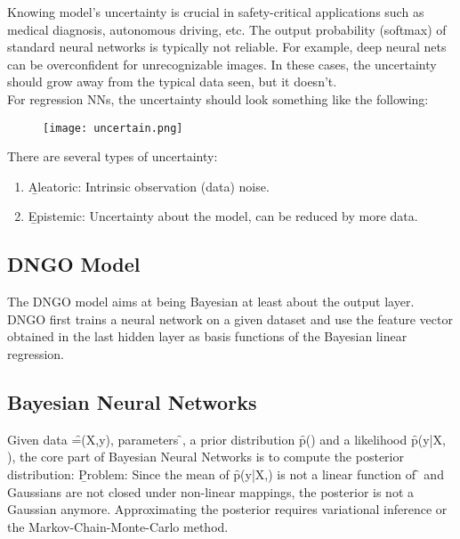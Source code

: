 Knowing model's uncertainty is crucial in safety-critical applications such as medical diagnosis, autonomous driving, etc. The output probability (softmax) of standard neural networks is typically not reliable. For example, deep neural nets can be overconfident for unrecognizable images. In these cases, the uncertainty should grow away from the typical data seen, but it doesn't.\\
For regression NNs, the uncertainty should look something like the following:
\begin{figure}[h!]
    \centering
    \texttt{[image: uncertain.png]}
\end{figure}

There are several types of uncertainty:
\begin{enumerate}
    \item \b{Aleatoric:} Intrinsic observation (data) noise.
    \item \b{Epistemic:} Uncertainty about the model, can be reduced by more data.
\end{enumerate}


\subsection{DNGO Model}
The DNGO model aims at being Bayesian at least about the output layer. DNGO first trains a neural network on a given dataset and use the feature vector obtained in the last hidden layer as basis functions of the Bayesian linear regression.

\subsection{Bayesian Neural Networks}
Given data \f{=(X,y)}, parameters \f{\theta}, a prior distribution \f{p(\theta)} and a likelihood \f{p(y|X, \theta)}, the core part of Bayesian Neural Networks is to compute the posterior distribution:
\b{Problem:} Since the mean of \f{p(y|X,\theta)} is not a linear function of \f{\theta} and Gaussians are not closed under non-linear mappings, the posterior is not a Gaussian anymore. Approximating the posterior requires variational inference or the  Markov-Chain-Monte-Carlo method.

